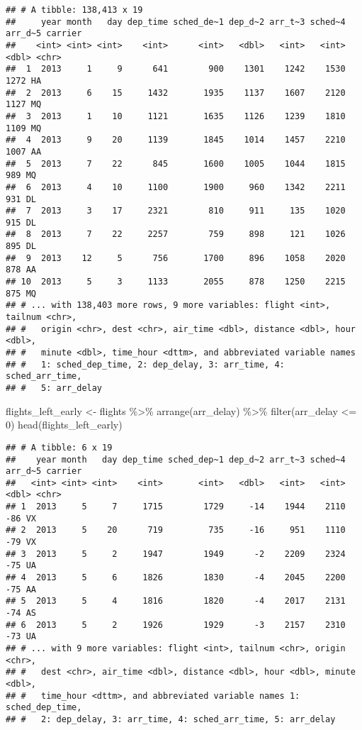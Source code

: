 \documentclass[
]{article}
\newenvironment{Shaded}{\begin{snugshade}}{\end{snugshade}}
\newcommand{\DecValTok}[1]{\textcolor[rgb]{0.00,0.00,0.81}{#1}}
\newcommand{\FunctionTok}[1]{\textcolor[rgb]{0.00,0.00,0.00}{#1}}
\newcommand{\NormalTok}[1]{#1}
\newcommand{\OtherTok}[1]{\textcolor[rgb]{0.56,0.35,0.01}{#1}}
\newcommand{\SpecialCharTok}[1]{\textcolor[rgb]{0.00,0.00,0.00}{#1}}
\begin{document}
\begin{verbatim}
## # A tibble: 138,413 x 19
##     year month   day dep_time sched_de~1 dep_d~2 arr_t~3 sched~4 arr_d~5 carrier
##    <int> <int> <int>    <int>      <int>   <dbl>   <int>   <int>   <dbl> <chr>  
##  1  2013     1     9      641        900    1301    1242    1530    1272 HA     
##  2  2013     6    15     1432       1935    1137    1607    2120    1127 MQ     
##  3  2013     1    10     1121       1635    1126    1239    1810    1109 MQ     
##  4  2013     9    20     1139       1845    1014    1457    2210    1007 AA     
##  5  2013     7    22      845       1600    1005    1044    1815     989 MQ     
##  6  2013     4    10     1100       1900     960    1342    2211     931 DL     
##  7  2013     3    17     2321        810     911     135    1020     915 DL     
##  8  2013     7    22     2257        759     898     121    1026     895 DL     
##  9  2013    12     5      756       1700     896    1058    2020     878 AA     
## 10  2013     5     3     1133       2055     878    1250    2215     875 MQ     
## # ... with 138,403 more rows, 9 more variables: flight <int>, tailnum <chr>,
## #   origin <chr>, dest <chr>, air_time <dbl>, distance <dbl>, hour <dbl>,
## #   minute <dbl>, time_hour <dttm>, and abbreviated variable names
## #   1: sched_dep_time, 2: dep_delay, 3: arr_time, 4: sched_arr_time,
## #   5: arr_delay
\end{verbatim}

\begin{Shaded}
\begin{Highlighting}[]
\NormalTok{flights\_left\_early }\OtherTok{\textless{}{-}}\NormalTok{ flights }\SpecialCharTok{\%\textgreater{}\%} \FunctionTok{arrange}\NormalTok{(arr\_delay) }\SpecialCharTok{\%\textgreater{}\%} \FunctionTok{filter}\NormalTok{(arr\_delay }\SpecialCharTok{\textless{}=} \DecValTok{0}\NormalTok{)}
\FunctionTok{head}\NormalTok{(flights\_left\_early)}
\end{Highlighting}
\end{Shaded}

\begin{verbatim}
## # A tibble: 6 x 19
##    year month   day dep_time sched_dep~1 dep_d~2 arr_t~3 sched~4 arr_d~5 carrier
##   <int> <int> <int>    <int>       <int>   <dbl>   <int>   <int>   <dbl> <chr>  
## 1  2013     5     7     1715        1729     -14    1944    2110     -86 VX     
## 2  2013     5    20      719         735     -16     951    1110     -79 VX     
## 3  2013     5     2     1947        1949      -2    2209    2324     -75 UA     
## 4  2013     5     6     1826        1830      -4    2045    2200     -75 AA     
## 5  2013     5     4     1816        1820      -4    2017    2131     -74 AS     
## 6  2013     5     2     1926        1929      -3    2157    2310     -73 UA     
## # ... with 9 more variables: flight <int>, tailnum <chr>, origin <chr>,
## #   dest <chr>, air_time <dbl>, distance <dbl>, hour <dbl>, minute <dbl>,
## #   time_hour <dttm>, and abbreviated variable names 1: sched_dep_time,
## #   2: dep_delay, 3: arr_time, 4: sched_arr_time, 5: arr_delay
\end{verbatim}
\end{document}

